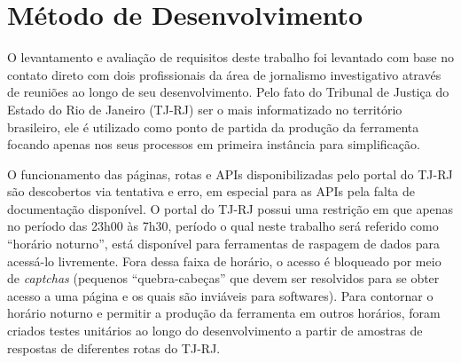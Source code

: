\section{Método de Desenvolvimento}

O levantamento e avaliação de requisitos deste trabalho foi levantado com base
no contato direto com dois profissionais da área de jornalismo investigativo
através de reuniões ao longo de seu desenvolvimento. Pelo fato do Tribunal de
Justiça do Estado do Rio de Janeiro (TJ-RJ) ser o mais informatizado no
território brasileiro, ele é utilizado como ponto de partida da produção da
ferramenta \tjscraper focando apenas nos seus processos em primeira instância
para simplificação.

O funcionamento das páginas, rotas e APIs disponibilizadas pelo portal do TJ-RJ
são descobertos via tentativa e erro, em especial para as APIs pela falta de
documentação disponível. O portal do TJ-RJ possui uma restrição em que apenas
no período das 23h00 às 7h30, período o qual neste trabalho será referido como
``horário noturno'', está disponível para ferramentas de raspagem de dados para
acessá-lo livremente. Fora dessa faixa de horário, o acesso é bloqueado por
meio de \textit{captchas} (pequenos ``quebra-cabeças'' que devem ser resolvidos
para se obter acesso a uma página e os quais são inviáveis para softwares).
Para contornar o horário noturno e permitir a produção da ferramenta em outros
horários, foram criados testes unitários ao longo do desenvolvimento a partir
de amostras de respostas de diferentes rotas do TJ-RJ.
